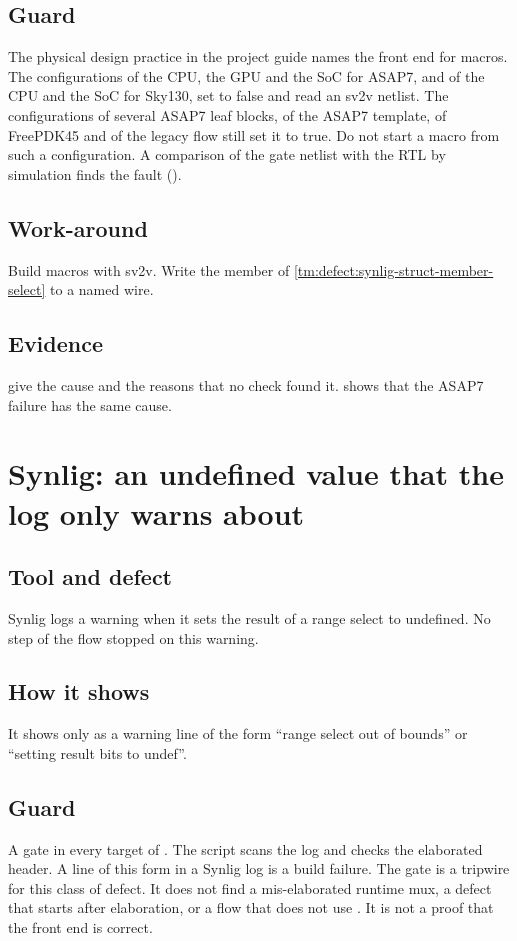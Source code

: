\subsection*{Guard}
The physical design practice in the project guide names the front end for macros. The configurations of the CPU, the GPU and the SoC for ASAP7, and of the CPU and the SoC for Sky130, set  to false and read an sv2v netlist. The configurations of several ASAP7 leaf blocks, of the ASAP7 template, of FreePDK45 and of the legacy flow still set it to true. Do not start a macro from such a configuration. A comparison of the gate netlist with the RTL by simulation finds the fault ().

\subsection*{Work-around}
Build macros with sv2v. Write the member of \cref{tm:defect:synlig-struct-member-select} to a named wire.

\subsection*{Evidence}
 give the cause and the reasons that no check found it.  shows that the ASAP7 failure has the same cause.

\section{Synlig: an undefined value that the log only warns about}\label{tm:defect:synlig-undef-warning}
\subsection*{Tool and defect}
Synlig logs a warning when it sets the result of a range select to undefined. No step of the flow stopped on this warning.

\subsection*{How it shows}
It shows only as a warning line of the form ``range select out of bounds'' or ``setting result bits to undef''.

\subsection*{Guard}
A gate in every  target of . The script  scans the log and checks the elaborated header. A line of this form in a Synlig log is a build failure. The gate is a tripwire for this class of defect. It does not find a mis-elaborated runtime mux, a defect that starts after elaboration, or a flow that does not use . It is not a proof that the front end is correct.

